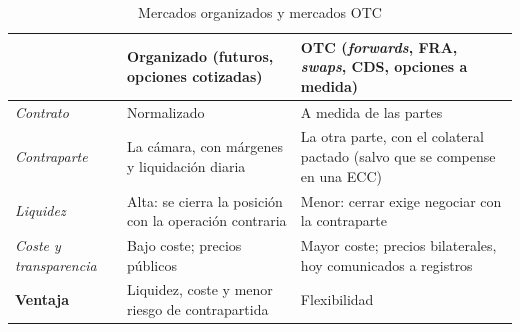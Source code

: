\documentclass[11pt]{article}
\begin{document}
\begin{table}[H]
\centering
\caption{Mercados organizados y mercados OTC}\label{tab:organizados-otc}
\small
\begin{tabular}{>{\raggedright\arraybackslash}m{3.2cm}>{\raggedright\arraybackslash}m{5.5cm}>{\raggedright\arraybackslash}m{5.5cm}}
\toprule
\rowcolor{tceeazulpalido} & \textbf{Organizado} (futuros, opciones cotizadas) & \textbf{OTC} (\emph{forwards}, FRA, \emph{swaps}, CDS, opciones a medida)\\
\midrule
\emph{Contrato} & Normalizado & A medida de las partes\\
\addlinespace[0.2em]
\emph{Contraparte} & La cámara, con márgenes y liquidación diaria & La otra parte, con el colateral pactado (salvo que se compense en una ECC)\\
\addlinespace[0.2em]
\emph{Liquidez} & Alta: se cierra la posición con la operación contraria & Menor: cerrar exige negociar con la contraparte\\
\addlinespace[0.2em]
\emph{Coste y transparencia} & Bajo coste; precios públicos & Mayor coste; precios bilaterales, hoy comunicados a registros\\
\addlinespace[0.2em]
\rowcolor{tceesalvia}\textbf{Ventaja} & \textcolor{tceeverde}{Liquidez, coste y menor riesgo de contrapartida} & \textcolor{tceedorado}{Flexibilidad}\\
\bottomrule
\end{tabular}
\end{table}
\end{document}
